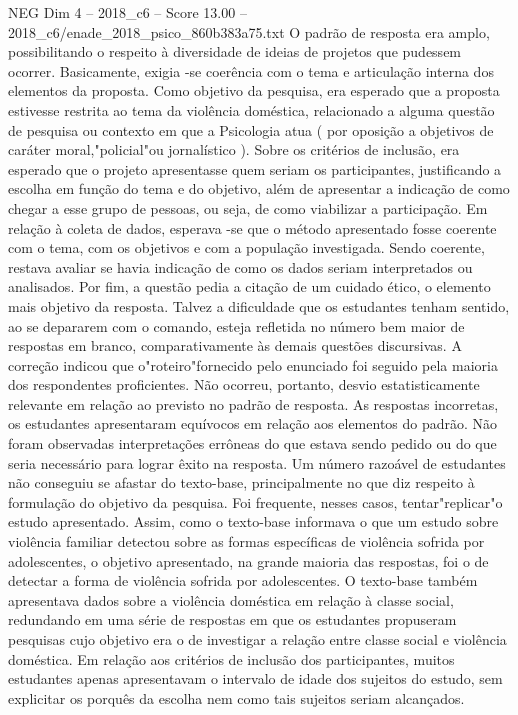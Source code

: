 \begin{textsample}{NEG Dim 4 – 2018\_c6 – Score 13.00 – 2018\_c6/enade\_2018\_psico\_860b383a75.txt}
O padrão de resposta era amplo, possibilitando o respeito à diversidade de ideias de projetos que pudessem ocorrer.
Basicamente, exigia -se coerência com o tema e articulação interna dos elementos da proposta.
Como objetivo da pesquisa, era esperado que a proposta estivesse restrita ao tema da violência doméstica, relacionado a alguma questão de pesquisa ou contexto em que a Psicologia atua ( por oposição a objetivos de caráter moral,"policial"ou jornalístico ).
Sobre os critérios de inclusão, era esperado que o projeto apresentasse quem seriam os participantes, justificando a escolha em função do tema e do objetivo, além de apresentar a indicação de como chegar a esse grupo de pessoas, ou seja, de como viabilizar a participação.
Em relação à coleta de dados, esperava -se que o método apresentado fosse coerente com o tema, com os objetivos e com a população investigada.
Sendo coerente, restava avaliar se havia indicação de como os dados seriam interpretados ou analisados.
Por fim, a questão pedia a citação de um cuidado ético, o elemento mais objetivo da resposta.
Talvez a dificuldade que os estudantes tenham sentido, ao se depararem com o comando, esteja refletida no número bem maior de respostas em branco, comparativamente às demais questões discursivas.
A correção indicou que o"roteiro"fornecido pelo enunciado foi seguido pela maioria dos respondentes proficientes.
Não ocorreu, portanto, desvio estatisticamente relevante em relação ao previsto no padrão de resposta.
As respostas incorretas, os estudantes apresentaram equívocos em relação aos elementos do padrão.
Não foram observadas interpretações errôneas do que estava sendo pedido ou do que seria necessário para lograr êxito na resposta.
Um número razoável de estudantes não conseguiu se afastar do texto-base, principalmente no que diz respeito à formulação do objetivo da pesquisa.
Foi frequente, nesses casos, tentar"replicar"o estudo apresentado.
Assim, como o texto-base informava o que um estudo sobre violência familiar detectou sobre as formas específicas de violência sofrida por adolescentes, o objetivo apresentado, na grande maioria das respostas, foi o de detectar a forma de violência sofrida por adolescentes.
O texto-base também apresentava dados sobre a violência doméstica em relação à classe social, redundando em uma série de respostas em que os estudantes propuseram pesquisas cujo objetivo era o de investigar a relação entre classe social e violência doméstica.
Em relação aos critérios de inclusão dos participantes, muitos estudantes apenas apresentavam o intervalo de idade dos sujeitos do estudo, sem explicitar os porquês da escolha nem como tais sujeitos seriam alcançados.

\end{textsample}
